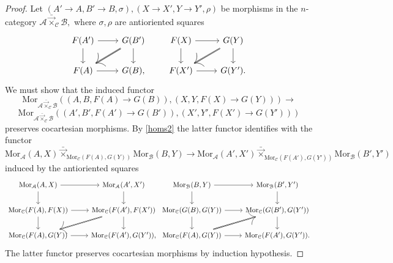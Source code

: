 \documentclass[10pt,oneside]{article}
\numberwithin{equation}{section} %
\numberwithin{figure}{section} %
\theoremstyle{plain}
\theoremstyle{definition}
\newcommand{\mA}{{\mathcal A}}
\newcommand{\mB}{{\mathcal B}}
\newcommand{\mC}{{\mathcal C}}
\newcommand{\Mor}{{\mathrm{Mor}}}
\begin{document}
\begin{proof}
Let $(A' \to A, B' \to B, \sigma), (X \to X', Y \to Y', \rho) $ be morphisms in the $n$-category $\mA {\bar{\vec{\times}}}_{\mC} \mB, $
where $\sigma, \rho$ are antioriented squares
\begin{equation*}
\begin{tikzcd}
F(A') \ar{r}{} \ar{d}[swap]{} & G(B') \ar[double]{dl}{} \ar{d}{} \\
F(A)  \ar{r}[swap]{} & G(B),
\end{tikzcd}
\qquad
\begin{tikzcd}
F(X) \ar{r}{} \ar{d}[swap]{} & G(Y) \ar[double]{dl}{} \ar{d}{} \\
F(X')  \ar{r}[swap]{} & G(Y').
\end{tikzcd}
\end{equation*}
We must show that the induced functor $$ \Mor_{\mA {\bar{\vec{\times}}}_{\mC} \mB}((A, B, F(A) \to G(B)), (X, Y, F(X) \to G(Y))) \to $$$$ \Mor_{\mA {\bar{\vec{\times}}}_{\mC} \mB}((A', B', F(A') \to G(B')), (X', Y', F(X') \to G(Y'))) $$ preserves cocartesian morphisms.
By \cref{homs2} the latter functor identifies with the functor
$$ {\Mor_\mA(A,X) {{\bar{\vec{\times}}}}_{\Mor_\mC(F(A), G(Y))}} \Mor_\mB(B,Y)
\to {\Mor_\mA(A',X') {{\bar{\vec{\times}}}}_{\Mor_\mC(F(A'), G(Y'))}} \Mor_\mB(B',Y') $$
induced by the antioriented squares
\begin{equation*}
\begin{tikzcd}
\Mor_\mA(A,X) \ar{r}{} \ar{d}[swap]{} & \Mor_\mA(A',X'){} \ar{d}{} \\
\Mor_\mC(F(A), F(X))  \ar{r}[swap]{} \ar{d}{} & \Mor_\mC(F(A'), F(X')) \ar{d}{}  \ar[double]{dl}
\\
\Mor_\mC(F(A), G(Y))  \ar{r}[swap]{} & \Mor_\mC(F(A'), G(Y')),
\end{tikzcd}
\begin{tikzcd}
\Mor_\mB(B,Y) \ar{r}{} \ar{d}[swap]{} & \Mor_\mB(B',Y') {} \ar{d}{} \\
\Mor_\mC(G(B), G(Y)) \ar{d}{} \ar{r}[swap]{} & \Mor_\mC(G(B'), G(Y')) \ar{d}{}
\\
\Mor_\mC(F(A), G(Y))  \ar[double]{ur} \ar{r}[swap]{} & \Mor_\mC(F(A'), G(Y')).
\end{tikzcd}
\end{equation*}
The latter functor preserves cocartesian morphisms
by induction hypothesis. 
\end{proof}
\end{document}

